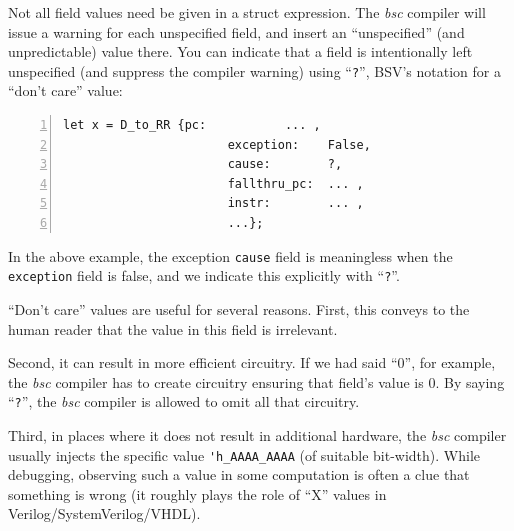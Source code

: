 \label{Sec_Dont_Care_Values}


Not all field values need be given in a struct expression.  The
\emph{bsc} compiler will issue a warning for each unspecified field,
and insert an ``unspecified'' (and unpredictable) value there.  You
can indicate that a field is intentionally left unspecified (and
suppress the compiler warning) using ``\verb|?|'', BSV's notation for
a ``don't care'' value:


{\small
\begin{Verbatim}[frame=single, numbers=left]
      let x = D_to_RR {pc:           ... ,
                       exception:    False,
                       cause:        ?,
                       fallthru_pc:  ... ,
                       instr:        ... ,
                       ...};
\end{Verbatim}
}

In the above example, the exception \verb|cause| field is meaningless
when the \verb|exception| field is false, and we indicate this
explicitly with ``\verb|?|''.

``Don't care'' values are useful for several reasons.  First, this
conveys to the human reader that the value in this field is
irrelevant.

Second, it can result in more efficient circuitry.  If we had said
``0'', for example, the \emph{bsc} compiler has to create circuitry
ensuring that field's value is 0. By saying ``\verb|?|'', the
\emph{bsc} compiler is allowed to omit all that circuitry.

Third, in places where it does not result in additional hardware, the
\emph{bsc} compiler usually injects the specific value
\verb|'h_AAAA_AAAA| (of suitable bit-width).  While debugging,
observing such a value in some computation is often a clue that
something is wrong (it roughly plays the role of ``X'' values in
Verilog/SystemVerilog/VHDL).

\vspace{2ex}

